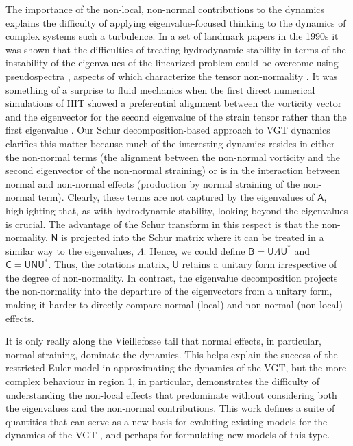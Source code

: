 \documentclass[preprint,amssymb,amsmath,aip,cha]{revtex4-1}
\begin{document}
The importance of the non-local, non-normal contributions to the dynamics explains the difficulty of applying eigenvalue-focused thinking to the dynamics of complex systems such a turbulence. In a set of landmark papers in the 1990s it was shown that the difficulties of treating hydrodynamic stability in terms of the instability of the eigenvalues of the linearized problem could be overcome using pseudospectra \citep{reddy93,trefethen93}, aspects of which characterize the tensor non-normality \citep{trefethen05}. It was something of a surprise to fluid mechanics when the first direct numerical simulations of HIT showed a preferential alignment between the vorticity vector and the eigenvector for the second eigenvalue of the strain tensor rather than the first eigenvalue \citep{kerr85,ashurst87}. Our Schur decomposition-based approach to VGT dynamics clarifies this matter because much of the interesting dynamics resides in either the non-normal terms (the alignment between the non-normal vorticity and the second eigenvector of the non-normal straining) or is in the interaction between normal and non-normal effects (production by normal straining of the non-normal term). Clearly, these terms are not captured by the eigenvalues of $\mathsf{A}$, highlighting that, as with hydrodynamic stability, looking beyond the eigenvalues is crucial. The advantage of the Schur transform in this respect is that the non-normality, $\mathsf{N}$ is projected into the Schur matrix where it can be treated in a similar way to the eigenvalues, $\Lambda$. Hence, we could define $\mathsf{B} = \mathsf{U}\mathsf{\Lambda}\mathsf{U}^{*}$ and $\mathsf{C} = \mathsf{U}\mathsf{N}\mathsf{U}^{*}$. Thus, the rotations matrix, $\mathsf{U}$ retains a unitary form irrespective of the degree of non-normality. In contrast, the eigenvalue decomposition projects the non-normality into the departure of the eigenvectors from a unitary form, making it harder to directly compare normal (local) and non-normal (non-local) effects. 

It is only really along the Vieillefosse tail that normal effects, in particular, normal straining, dominate the dynamics. This helps explain the success of the restricted Euler model \citep{cantwell92} in approximating the dynamics of the VGT, but the more complex behaviour in region 1, in particular, demonstrates the difficulty of understanding the non-local effects that predominate without considering both the eigenvalues and the non-normal contributions. This work defines a suite of quantities that can serve as a new basis for evaluting existing models for the dynamics of the VGT \citep{wilczek14,johnson16}, and perhaps for formulating new models of this type. 
\end{document}
